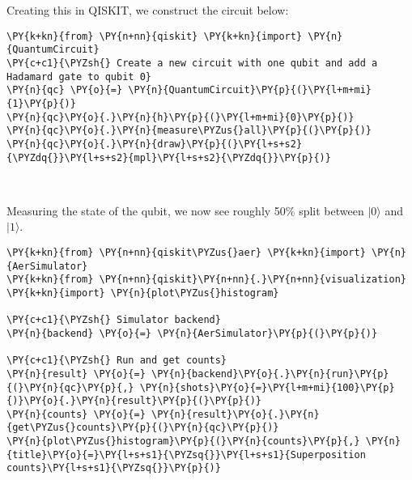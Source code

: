 Creating this in QISKIT, we construct the circuit below:

    \begin{tcolorbox}[breakable, size=fbox, boxrule=1pt, pad at break*=1mm,colback=cellbackground, colframe=cellborder]
\begin{Verbatim}[commandchars=\\\{\}]
\PY{k+kn}{from} \PY{n+nn}{qiskit} \PY{k+kn}{import} \PY{n}{QuantumCircuit}
\PY{c+c1}{\PYZsh{} Create a new circuit with one qubit and add a Hadamard gate to qubit 0}
\PY{n}{qc} \PY{o}{=} \PY{n}{QuantumCircuit}\PY{p}{(}\PY{l+m+mi}{1}\PY{p}{)}
\PY{n}{qc}\PY{o}{.}\PY{n}{h}\PY{p}{(}\PY{l+m+mi}{0}\PY{p}{)}
\PY{n}{qc}\PY{o}{.}\PY{n}{measure\PYZus{}all}\PY{p}{(}\PY{p}{)}
\PY{n}{qc}\PY{o}{.}\PY{n}{draw}\PY{p}{(}\PY{l+s+s2}{\PYZdq{}}\PY{l+s+s2}{mpl}\PY{l+s+s2}{\PYZdq{}}\PY{p}{)}
\end{Verbatim}
\end{tcolorbox}
 
            
    
    \begin{center}
    \end{center}
    { \hspace*{\fill} \\}
    

    Measuring the state of the qubit, we now see roughly 50\% split between
\(\lvert 0 \rangle\) and \(\lvert 1 \rangle\).

    \begin{tcolorbox}[breakable, size=fbox, boxrule=1pt, pad at break*=1mm,colback=cellbackground, colframe=cellborder]
\begin{Verbatim}[commandchars=\\\{\}]
\PY{k+kn}{from} \PY{n+nn}{qiskit\PYZus{}aer} \PY{k+kn}{import} \PY{n}{AerSimulator}
\PY{k+kn}{from} \PY{n+nn}{qiskit}\PY{n+nn}{.}\PY{n+nn}{visualization} \PY{k+kn}{import} \PY{n}{plot\PYZus{}histogram}

\PY{c+c1}{\PYZsh{} Simulator backend}
\PY{n}{backend} \PY{o}{=} \PY{n}{AerSimulator}\PY{p}{(}\PY{p}{)}

\PY{c+c1}{\PYZsh{} Run and get counts}
\PY{n}{result} \PY{o}{=} \PY{n}{backend}\PY{o}{.}\PY{n}{run}\PY{p}{(}\PY{n}{qc}\PY{p}{,} \PY{n}{shots}\PY{o}{=}\PY{l+m+mi}{100}\PY{p}{)}\PY{o}{.}\PY{n}{result}\PY{p}{(}\PY{p}{)}
\PY{n}{counts} \PY{o}{=} \PY{n}{result}\PY{o}{.}\PY{n}{get\PYZus{}counts}\PY{p}{(}\PY{n}{qc}\PY{p}{)}
\PY{n}{plot\PYZus{}histogram}\PY{p}{(}\PY{n}{counts}\PY{p}{,} \PY{n}{title}\PY{o}{=}\PY{l+s+s1}{\PYZsq{}}\PY{l+s+s1}{Superposition counts}\PY{l+s+s1}{\PYZsq{}}\PY{p}{)}
\end{Verbatim}
\end{tcolorbox}
 
